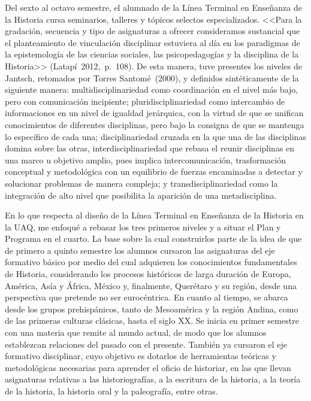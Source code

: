 Del sexto al octavo semestre, el alumnado de la Línea Terminal en 
Enseñanza de la Historia cursa seminarios, talleres y tópicos selectos 
especializados. <<Para la gradación, secuencia y tipo de asignaturas a 
ofrecer consideramos sustancial que el planteamiento de vinculación 
disciplinar estuviera al día en los paradigmas de la epistemología de 
las ciencias sociales, las psicopedagogías y la disciplina de la 
Historia>> (Latapí~2012,~p.~108). De esta manera, tuve presentes los niveles de 
Jantsch, retomados por Torres Santomé~(2000), y definidos sintéticamente 
de la siguiente manera: multidisciplinariedad como coordinación en el 
nivel más bajo, pero con comunicación incipiente; pluridisciplinariedad 
como intercambio de informaciones en un nivel de igualdad  jerárquica, 
con la virtud de que se unifican conocimientos de diferentes 
disciplinas, pero bajo la consigna de que se mantenga lo específico de 
cada una; disciplinariedad cruzada en la que una de las disciplinas 
domina sobre las otras, interdisciplinariedad que rebasa el reunir 
disciplinas en una marco u objetivo amplio, pues implica 
intercomunicación, trasformación  conceptual y metodológica con un 
equilibrio de fuerzas encaminadas a detectar y solucionar problemas de 
manera compleja; y transdisciplinariedad como la integración de alto 
nivel que posibilita la aparición de una metadisciplina.
\newpage

En lo que respecta al diseño de la  Línea Terminal en Enseñanza de la 
Historia en la UAQ, me enfoqué a rebasar los tres primeros niveles y a 
situar el Plan y Programa en el cuarto. La base sobre la cual 
construirlos parte de la idea de que de primero a quinto semestre los 
alumnos cursaron las asignaturas del eje formativo básico por medio del 
cual adquieren los conocimientos fundamentales de Historia, 
considerando los procesos históricos de larga duración de Europa, 
América, Asía y África, México y, finalmente, Querétaro y su región, 
desde una perspectiva que pretende no ser eurocéntrica. En cuanto al 
tiempo, se abarca desde los grupos prehispánicos, tanto de Mesoamérica y 
la región Andina, como de las primeras culturas clásicas, hasta el 
siglo XX\@. Se inicia en primer semestre con una materia que remite al 
mundo actual, de modo  que los alumnos establezcan relaciones del pasado con 
el presente.  También ya cursaron el eje formativo disciplinar, cuyo 
objetivo es dotarlos de herramientas teóricas y metodológicas 
necesarias para aprender el oficio de historiar, en las que llevan 
asignaturas relativas a las historiografías, a la escritura de la 
historia, a la teoría de la historia,  la historia oral y la 
paleografía, entre otras.  

